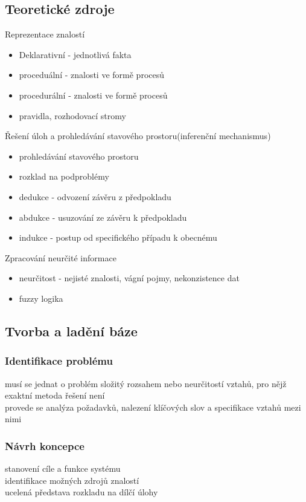 \subsection{Teoretické zdroje}
Reprezentace znalostí
\begin{itemize}
    \item Deklarativní - jednotlivá fakta
    \item proceduální - znalosti ve formě procesů
    \item procedurální - znalosti ve formě procesů
    \item pravidla, rozhodovací stromy
\end{itemize}
Řešení úloh a prohledávání stavového prostoru(inferenční mechanismus)
\begin{itemize}
    \item prohledávání stavového prostoru
    \item rozklad na podproblémy
    \item dedukce - odvození závěru z předpokladu
    \item abdukce - usuzování ze závěru k předpokladu
    \item indukce - postup od specifického případu k obecnému
\end{itemize}
Zpracování neurčité informace
\begin{itemize}
    \item neurčitost - nejisté znalosti, vágní pojmy, nekonzistence dat
    \item fuzzy logika
\end{itemize}

\subsection{Tvorba a ladění báze}
\subsubsection{Identifikace problému}
musí se jednat o problém složitý rozsahem nebo neurčitostí vztahů, pro nějž exaktní metoda řešení není\\
provede se analýza požadavků, nalezení klíčových slov a specifikace vztahů mezi nimi

\subsubsection{Návrh koncepce}
stanovení cíle a funkce systému\\
identifikace možných zdrojů znalostí\\
ucelená představa rozkladu na dílčí úlohy\\

